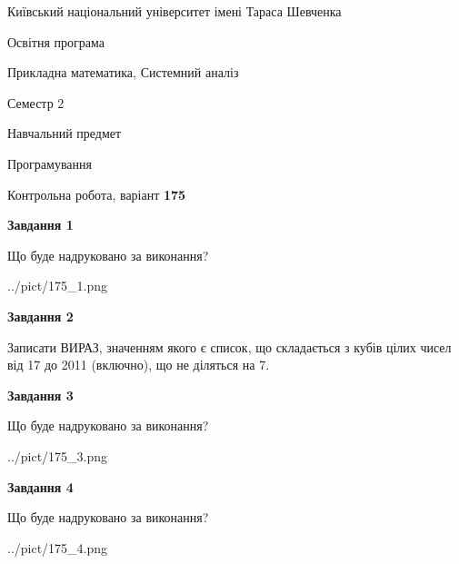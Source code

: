 \documentclass[12pt, ukrainian]{article}
\begin{document}
{{\begin {small}\par
{ \center  Київський національний університет імені Тараса Шевченка \par}
{\parbox {5 cm}{Освітня програма \hfill}{\parbox {8 cm}{Прикладна математика, Системний аналіз \hfill}}\parbox {5 cm}{\hfill Семестр 2}}\par
{\parbox {5 cm} {Навчальний предмет \hfill}\parbox {7 cm}{Програмування \hfill}\parbox {6cm}{\hfill}\par}\vspace{-7pt} \end{small}}{\center Контрольна робота, варіант  \No \textbf
{ 175 }\par}}
{
\begin {large}
{\begin {center}\textbf{Завдання 1}\end {center}}\par
Що буде надруковано за виконання?\par\par
\begin{center}
	{../pict/175_1.png}
\end{center}
\newpage

{\begin {center}\textbf{Завдання 2}\end {center}}\par

Записати ВИРАЗ, значенням якого є список, що складається з кубів цілих чисел від 17 до 2011 (включно), що не діляться на 7.\par
\newpage

{\begin {center}\textbf{Завдання 3}\end {center}}\par
Що буде надруковано за виконання?\par
\begin{center}
	{../pict/175_3.png}
\end{center}
\newpage

{\begin {center}\textbf{Завдання 4}\end {center}}\par
Що буде надруковано за виконання?\par
\begin{center}
	{../pict/175_4.png}
\end{center}
\newpage


\end{large}}
\end{document}
